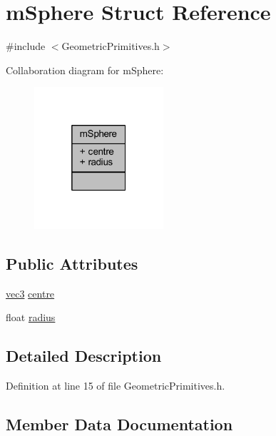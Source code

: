 \hypertarget{structm_sphere}{}\section{m\+Sphere Struct Reference}
\label{structm_sphere}


{\ttfamily \#include $<$Geometric\+Primitives.\+h$>$}



Collaboration diagram for m\+Sphere\+:\nopagebreak
\begin{figure}[H]
\begin{center}
\leavevmode
\includegraphics[width=136pt]{structm_sphere__coll__graph}
\end{center}
\end{figure}
\subsection*{Public Attributes}
\begin{DoxyCompactItemize}
\item 
\hyperlink{_types_8h_a3d0ce73e3199de81565fb01632415288}{vec3} \hyperlink{structm_sphere_a8d00b6777a45df63673bc9618fa2a578}{centre}
\item 
float \hyperlink{structm_sphere_a243b1a0cdd4bf9b26fbdaf9d40e6fca8}{radius}
\end{DoxyCompactItemize}


\subsection{Detailed Description}


Definition at line 15 of file Geometric\+Primitives.\+h.



\subsection{Member Data Documentation}
